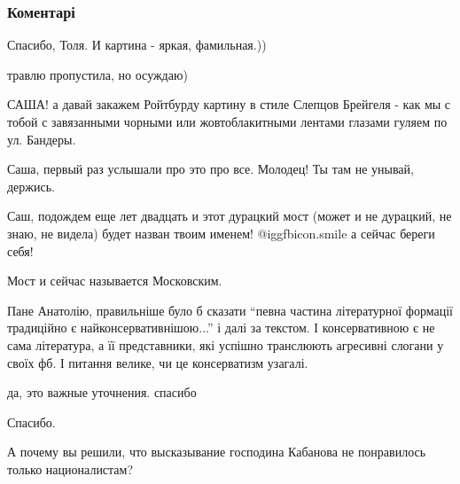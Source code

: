  
 
 
 
 
\subsubsection{Коментарі}

\begin{itemize} %

Спасибо, Толя. И картина - яркая, фамильная.))

\begin{itemize} %
травлю пропустила, но осуждаю)


САША! а давай закажем Ройтбурду картину в стиле Слепцов Брейгеля - как мы с
тобой с завязанными чорными или жовтоблакитными лентами глазами гуляем по ул.
Бандеры.

Саша, первый раз услышали про это про все. Молодец! Ты там не унывай, держись.
\end{itemize} %


Саш, подождем еще лет двадцать и этот дурацкий мост (может и не дурацкий, не
знаю, не видела) будет назван твоим именем!  @igg{fbicon.smile}  а сейчас береги себя!

\begin{itemize} %
Мост и сейчас называется Московским.
\end{itemize} %


Пане Анатолію, правильніше було б сказати \enquote{певна частина літературної формації
традиційно є найконсервативнішою...} і далі за текстом. І консервативною є не
сама література, а її представники, які успішно транслюють агресивні слогани у
своїх фб. І питання велике, чи це консерватизм узагалі.

да, это важные уточнения. спасибо

Спасибо.

А почему вы решили, что высказывание господина Кабанова не понравилось только националистам?


\end{itemize}
